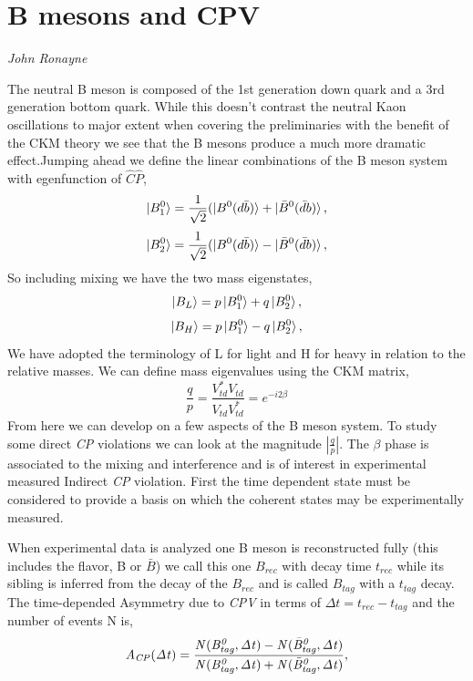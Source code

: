 %

\section{B mesons and CPV}
\vspace{-1.0em}
\begin{center}
\tiny{\textit{John Ronayne}}
\end{center}

The neutral B meson is composed of the 1st generation down quark and a 3rd generation bottom quark. While this doesn't contrast the neutral Kaon oscillations to major extent when covering the preliminaries with the benefit of the CKM theory we see that the B mesons produce a much more dramatic effect.Jumping ahead we define the linear combinations of the B meson system with egenfunction of $\hat{C}\hat{P}$,
\[\ket{B^{0}_{1}}=\frac{1}{\sqrt{2}}(\ket{B^{0}(d\bar{b})}+\ket{\bar{B}^{0}(\bar{d}b)},\]
\[\ket{B^{0}_{2}}=\frac{1}{\sqrt{2}}(\ket{B^{0}(d\bar{b})}-\ket{\bar{B}^{0}(\bar{d}b)},\]
So including mixing we have the two mass eigenstates,
\[\ket{B_{L}}=p\ket{B^{0}_{1}}+q\ket{{B}^{0}_{2}},\]
\[\ket{B_{H}}=p\ket{B^{0}_{1}}-q\ket{{B}^{0}_{2}},\]
We have adopted the terminology of L for light and H for heavy in relation to the relative masses. We can define mass eigenvalues using the CKM matrix,
\[\frac{q}{p}=\frac{V^{*}_{td}V_{td}}{V_{td}V^{*}_{td}}=e^{-i2\beta}\]
From here we can develop on a few aspects of the B meson system. To study some direct  \textit{CP} violations we can look at the magnitude  $\left| \frac{q}{p} \right|$. The $\beta$ phase is associated to the mixing and interference and is of interest in experimental measured Indirect  \textit{CP} violation. First the time dependent state must be considered to provide a basis on which the coherent states may be experimentally measured. 


When experimental data is analyzed one B meson is reconstructed fully (this includes the flavor, B or $\bar{B}$) we call this one $B_{rec}$ with decay time $t_{rec}$ while its sibling is inferred from the decay of the $B_{rec}$ and is called $B_{tag}$ with a $t_{tag}$ decay. The time-depended Asymmetry due to \textit{CPV} in terms of $\Delta{t} = t_{rec}-t_{tag}$ and the number of events N is,
\[\it{A}_{CP}(\Delta t)= \frac{N(B^{0}_{tag},\Delta t)-N(\bar{B}^{0}_{tag},\Delta t)}{N(B^{0}_{tag},\Delta t)+N(\bar{B}^{0}_{tag},\Delta t)},\]




